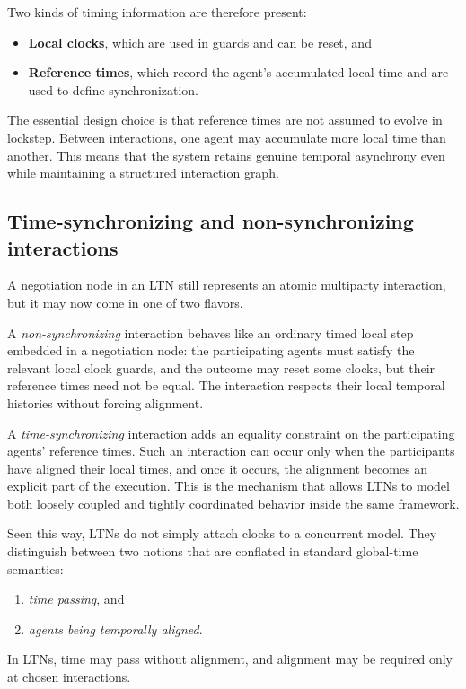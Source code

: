 Two kinds of timing information are therefore present:
\begin{itemize}
    \item \textbf{Local clocks}, which are used in guards and can be reset, and
    \item \textbf{Reference times}, which record the agent's accumulated local time and are used to define synchronization.
\end{itemize}

The essential design choice is that reference times are not assumed to evolve in lockstep. Between interactions, one agent may accumulate more local time than another. This means that the system retains genuine temporal asynchrony even while maintaining a structured interaction graph.

\subsection{Time-synchronizing and non-synchronizing interactions}

A negotiation node in an LTN still represents an atomic multiparty interaction, but it may now come in one of two flavors.

A \emph{non-synchronizing} interaction behaves like an ordinary timed local step embedded in a negotiation node: the participating agents must satisfy the relevant local clock guards, and the outcome may reset some clocks, but their reference times need not be equal. The interaction respects their local temporal histories without forcing alignment.

A \emph{time-synchronizing} interaction adds an equality constraint on the participating agents' reference times. Such an interaction can occur only when the participants have aligned their local times, and once it occurs, the alignment becomes an explicit part of the execution. This is the mechanism that allows LTNs to model both loosely coupled and tightly coordinated behavior inside the same framework.

Seen this way, LTNs do not simply attach clocks to a concurrent model. They distinguish between two notions that are conflated in standard global-time semantics:
\begin{enumerate}
    \item \emph{time passing}, and
    \item \emph{agents being temporally aligned}.
\end{enumerate}
In LTNs, time may pass without alignment, and alignment may be required only at chosen interactions.

